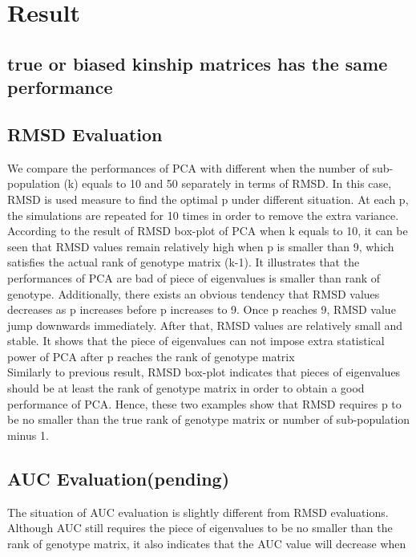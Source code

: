 \documentclass[12pt]{article}
\theoremstyle{definition}
\theoremstyle{plain}
\begin{document}
\section{Result}

\subsection{true or biased kinship matrices has the same performance}

\subsection{RMSD Evaluation}
We compare the performances of PCA with different when the number of sub-population (k) equals to 10 and 50 separately in terms of RMSD. In this case, RMSD is used measure to find the optimal p under different situation. At each p, the simulations are repeated for 10 times in order to remove the extra variance.\\

According to the result of RMSD box-plot of PCA when k equals to 10, it can be seen that RMSD values remain relatively high when p is smaller than 9, which satisfies the actual rank of genotype matrix (k-1). It illustrates that the performances of PCA are bad of piece of eigenvalues is smaller than rank of genotype. Additionally, there exists an obvious tendency that RMSD values decreases as p increases before p increases to 9. Once p reaches 9, RMSD value jump downwards immediately. After that, RMSD values are relatively small and stable. It shows that the piece of eigenvalues can not impose extra statistical power of PCA after p reaches the rank of genotype matrix\\

Similarly to previous result, RMSD box-plot indicates that pieces of eigenvalues should be at least the rank of genotype matrix in order to obtain a good performance of PCA. Hence, these two examples show that RMSD requires p to be no smaller than the true rank of genotype matrix or number of sub-population minus 1.

\subsection{AUC Evaluation(pending)}
The situation of AUC evaluation is slightly different from RMSD evaluations. Although AUC still requires the piece of eigenvalues to be no smaller than the rank of genotype matrix, it also indicates that the AUC value will decrease when  
\end{document}
